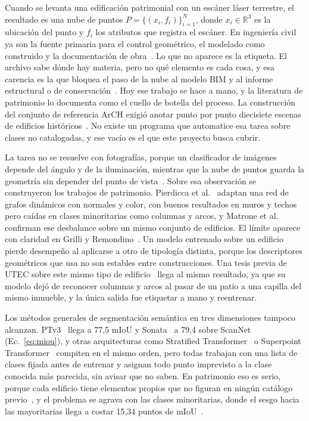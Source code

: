 
\renewcommand{\thetable}{\Alph{table}}

Cuando se levanta una edificación patrimonial con un escáner láser terrestre, el
resultado es una nube de puntos $P=\{(x_i,f_i)\}_{i=1}^{N}$, donde
$x_i\in\mathbb{R}^3$ es la ubicación del punto y $f_i$ los atributos que registra
el escáner. En ingeniería civil ya son la fuente primaria para el control geométrico, el
modelado como construido y la documentación de obra~\cite{wang2019construction}. Lo que no aparece es la etiqueta. El archivo
sabe dónde hay materia, pero no qué elemento es cada cosa, y esa carencia es la
que bloquea el paso de la nube al modelo BIM y al informe estructural o de
conservación~\cite{wang2019construction}. Hoy ese trabajo se hace a mano, y la
literatura de patrimonio lo documenta como el cuello de botella del proceso. La
construcción del conjunto de referencia ArCH exigió anotar punto por punto
diecisiete escenas de edificios históricos~\cite{matrone2020benchmark}. No existe
un programa que automatice esa tarea sobre clases no catalogadas, y ese vacío es
el que este proyecto busca cubrir.

La tarea no se resuelve con fotografías, porque un clasificador de imágenes
depende del ángulo y de la iluminación, mientras que la nube de puntos guarda la
geometría sin depender del punto de vista~\cite{pierdicca2020dgcnn}. Sobre esa observación se construyeron los trabajos de patrimonio. Pierdicca et
al.~\cite{pierdicca2020dgcnn} adaptan una red de grafos dinámicos con normales y
color, con buenos resultados en muros y techos pero caídas en clases minoritarias
como columnas y arcos, y Matrone et al.~\cite{matrone2020benchmark} confirman ese
desbalance sobre un mismo conjunto de edificios. El límite aparece con claridad en Grilli y
Remondino~\cite{grilli2020generalisation}. Un modelo entrenado sobre un edificio
pierde desempeño al aplicarse a otro de tipología distinta, porque los
descriptores geométricos que usa no son estables entre construcciones. Una tesis
previa de UTEC sobre este mismo tipo de edificio~\cite{tesisutec2024} llega al
mismo resultado, ya que su modelo dejó de reconocer columnas y arcos al pasar de
un patio a una capilla del mismo inmueble, y la única salida fue etiquetar a mano
y reentrenar.

Los métodos generales de segmentación semántica en tres dimensiones tampoco
alcanzan. PTv3~\cite{wu2024ptv3} llega a 77,5 mIoU y Sonata~\cite{wu2025sonata} a 79,4 sobre
ScanNet (Ec.~\eqref{eq:miou}), y otras arquitecturas como Stratified
Transformer~\cite{lai2022stratified} o Superpoint
Transformer~\cite{robert2023spt} compiten en el mismo orden, pero todas trabajan
con una lista de clases fijada antes de entrenar y asignan todo punto imprevisto
a la clase conocida más parecida, sin avisar que no saben. En patrimonio eso es
serio, porque cada edificio tiene elementos propios que no figuran en ningún
catálogo previo~\cite{grilli2020generalisation}, y el problema se agrava con las
clases minoritarias, donde el sesgo hacia las mayoritarias llega a costar 15,34
puntos de mIoU~\cite{su2025brdl}.

